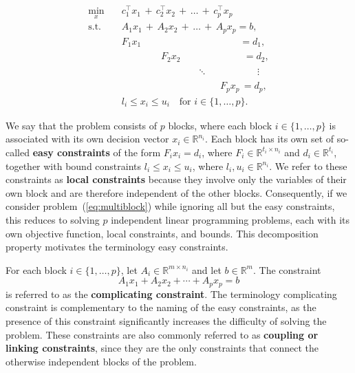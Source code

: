 \documentclass{book}
\theoremstyle{definition}
\numberwithin{algorithm_}{chapter}
\begin{document}
\begin{equation}\label{eq:multiblock}
\begin{aligned}
\min_{x} \quad & c_1^\top x_1 \, + \, c_2^\top x_2 \, + \, \ldots \, + \, c_p^\top x_p \\
\text{s.t.} 
\quad & A_1 x_1 \, + \, A_2 x_2 \, + \, \ldots \, + \, A_p x_p = b, \\
\quad & F_1 x_1 \phantom{\; + F_2 x_2 + \cdots + F_p x_p \;} \, \quad = d_1,\\
\quad & \phantom{F_1 x_1 + \;}\; \; F_2 x_2 \phantom{\; + \cdots + F_p x_p \;} \; \; \, = d_2, \\
& \phantom{F_1 x_1 + F_2 x_2 + \;} \quad \ddots \phantom{\; + F_p x_p = \;} \vdots  \\
\quad & \phantom{F_1 x_1 + F_2 x_2 + \cdots + \;} \, \quad \; F_p x_p \, = d_p,\\
\quad & l_i \le x_i \le u_i \quad \text{for } i\in\{1,\dots,p\}.
\end{aligned}
\end{equation}

We say that the problem consists of $p$ blocks, where each block $i \in \{1,\dots,p\}$ is associated with its own decision vector 
$x_i \in \mathbb{R}^{n_i}$. Each block has its own set of so-called \textbf{easy constraints} of the form $F_i x_i = d_i$, where 
$F_i \in \mathbb{R}^{t_i \times n_i}$ and $d_i \in \mathbb{R}^{t_i}$, together with bound constraints 
$l_i \le x_i \le u_i$, where $l_i, u_i \in \mathbb{R}^{n_i}$. 
We refer to these constraints as \textbf{local constraints} because they involve only the variables of their own block and are therefore 
independent of the other blocks. Consequently, if we consider problem~(\ref{eq:multiblock}) while ignoring all but the easy constraints, this reduces to solving $p$ independent linear programming problems, each with its own objective function, local constraints, and bounds. 
This decomposition property motivates the terminology easy constraints.

\bigskip

For each block 
$i \in \{1,\dots,p\}$, let $A_i \in \mathbb{R}^{m \times n_i}$ 
and let $b \in \mathbb{R}^{m}$. The constraint 
\[
A_1 x_1 + A_2 x_2 + \cdots + A_p x_p = b
\]
is referred to as the \textbf{complicating constraint}. The terminology complicating constraint is complementary to the naming of the 
easy constraints, as the presence of this constraint significantly increases the difficulty of solving the problem. These constraints 
are also commonly referred to as \textbf{coupling or linking constraints}, since they are the only constraints that connect the otherwise 
independent blocks of the problem.
\end{document}
